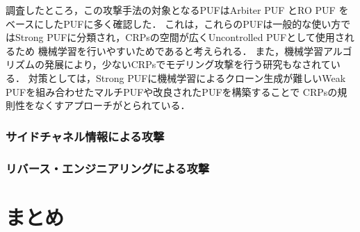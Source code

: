 \documentclass[technicalreport]{ieicej} %
\begin{document}
調査したところ，この攻撃手法の対象となるPUFはArbiter PUF\cite{crps apuf1,crps apuf2,crps apuf3 multi1,crps apuf4 side,crps apuf5 multi2,crps apuf6,crps modeling,crps apuf7 crc}
とRO PUF\cite{nozaki,crps modeling,crps RO}
をベースにしたPUFに多く確認した．
これは，これらのPUFは一般的な使い方ではStrong PUFに分類され，CRPsの空間が広くUncontrolled PUFとして使用されるため
機械学習を行いやすいためであると考えられる．
また，機械学習アルゴリズムの発展により，少ないCRPsでモデリング攻撃を行う研究もなされている\cite{nozaki}．
対策としては，Strong PUFに機械学習によるクローン生成が難しいWeak PUFを組み合わせたマルチPUF\cite{crps apuf3 multi1,crps apuf5 multi2}や改良されたPUF\cite{crps apuf7 crc}を構築することで
CRPsの規則性をなくすアプローチがとられている．

\subsubsection{サイドチャネル情報による攻撃}
\label{sidechannel}

\subsubsection{リバース・エンジニアリングによる攻撃}
\label{reattack}



\section{まとめ}

\end{document}
